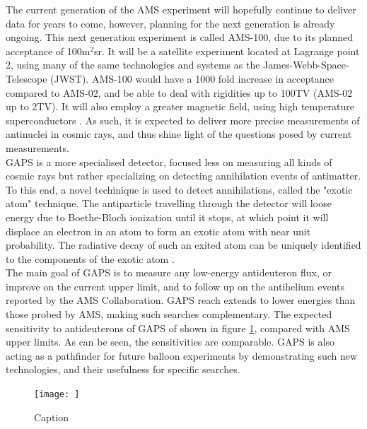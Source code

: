 The current generation of the AMS experiment will hopefully continue to deliver data for years to come, however, planning for the next generation is already ongoing. This next generation experiment is called AMS-100, due to its planned acceptance of 100m$^2$sr. It will be a satellite experiment located at Lagrange point 2, using many of the same technologies and systems as the James-Webb-Space-Telescope (JWST). AMS-100 would have a 1000 fold increase in acceptance compared to AMS-02, and be able to deal with rigidities up to 100TV (AMS-02 up to 2TV). It will also employ a greater magnetic field, using high temperature superconductors \cite{}. As such, it is expected to deliver more precise measurements of antinuclei in cosmic rays, and thus shine light of the questions posed by current measurements.\\

GAPS is a more specialised detector, focused less on measuring all kinds of cosmic rays but rather specializing on detecting annihilation events of antimatter. To this end, a novel techinique is used to detect annihilations, called the "exotic atom" technique. The antiparticle travelling through the detector will loose energy due to Boethe-Bloch ionization until it stops, at which point it will displace an electron in an atom to form an exotic atom with near unit probability. The radiative decay of such an exited atom can be uniquely identified to the components of the exotic atom \cite{}. \\

The main goal of GAPS is to measure any low-energy antideuteron flux, or improve on the current upper limit, and to follow up on the antihelium events reported by the AMS Collaboration. GAPS reach extends to lower energies than those probed by AMS, making such searches complementary. The expected sensitivity to antideuterons of GAPS of shown in figure \ref{fig:GAPS_sensitivity}, compared with AMS upper limits. As can be seen, the sensitivities are comparable. GAPS is also acting as a pathfinder for future balloon experiments by demonstrating such new technologies, and their usefulness for specific searches.

\begin{figure}
    \centering
    \texttt{[image: ]}
    \caption{Caption}
    \label{fig:GAPS_sensitivity}
\end{figure}





